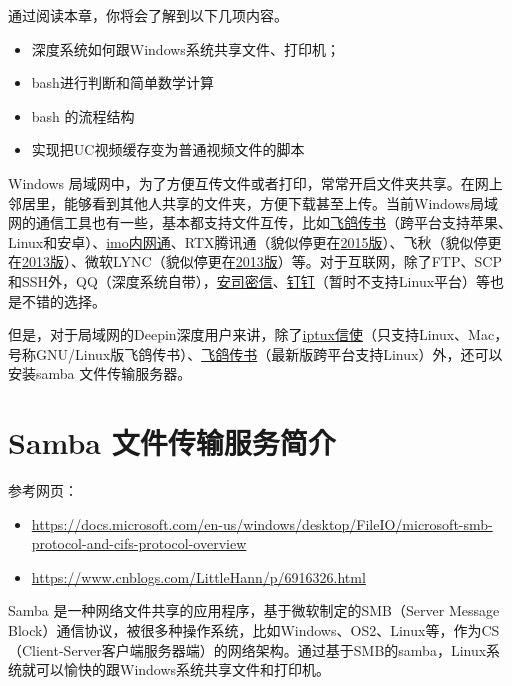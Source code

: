 \documentclass[doctor,openright,twoside]{sjtuthesis}
\providecommand{\tightlist}{%
    \setlength{\itemsep}{0pt}\setlength{\parskip}{0pt}}
\theoremstyle{plain}
\theoremstyle{definition}
\theoremstyle{remark}
\theoremstyle{ocrenumbox}
\theoremstyle{plain}
\begin{document}
通过阅读本章，你将会了解到以下几项内容。

\begin{itemize}
\tightlist
\item
  深度系统如何跟Windows系统共享文件、打印机；
\item
  bash进行判断和简单数学计算
\item
  bash 的流程结构
\item
  实现把UC视频缓存变为普通视频文件的脚本
\end{itemize}

Windows
局域网中，为了方便互传文件或者打印，常常开启文件夹共享。在网上邻居里，能够看到其他人共享的文件夹，方便下载甚至上传。当前Windows局域网的通信工具也有一些，基本都支持文件互传，比如\href{http://www.feige360.com}{飞鸽传书}（跨平台支持苹果、Linux和安卓）、\href{www.imoffice.com}{imo内网通}、RTX腾讯通（貌似停更在\href{https://rtx.tencent.com/rtx/download/index.shtml}{2015版}）、飞秋（貌似停更在\href{http://bbs.feiq18.com/config_nav.php?id=19}{2013版}）、微软LYNC（貌似停更在\href{https://products.office.com/en-us/previous-versions/microsoft-lync-2013}{2013版}）等。对于互联网，除了FTP、SCP和SSH外，QQ（深度系统自带），\href{http://akey.me/}{安司密信}、\href{https://www.dingtalk.com/}{钉钉}（暂时不支持Linux平台）等也是不错的选择。

但是，对于局域网的Deepin深度用户来讲，除了\href{https://github.com/iptux-src/iptux}{iptux信使}（只支持Linux、Mac，号称GNU/Linux版飞鸽传书）、\href{http://www.feige360.com/}{飞鸽传书}（最新版跨平台支持Linux）外，还可以安装samba
文件传输服务器。

\hypertarget{samba-}{%
\section{Samba 文件传输服务简介}\label{samba-}}

参考网页：

\begin{itemize}
\tightlist
\item
  \url{https://docs.microsoft.com/en-us/windows/desktop/FileIO/microsoft-smb-protocol-and-cifs-protocol-overview}
\item
  \url{https://www.cnblogs.com/LittleHann/p/6916326.html}
\end{itemize}

Samba 是一种网络文件共享的应用程序，基于微软制定的SMB（Server Message
Block）通信协议，被很多种操作系统，比如Windows、OS2、Linux等，作为CS（Client-Server客户端服务器端）的网络架构。通过基于SMB的samba，Linux系统就可以愉快的跟Windows系统共享文件和打印机。
\end{document}
